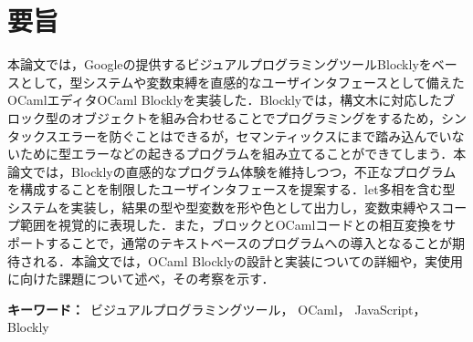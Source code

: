 \chapter*{要旨}

本論文では，Googleの提供するビジュアルプログラミングツールBlocklyをベースとして，型システムや変数束縛を直感的なユーザインタフェースとして備えたOCamlエディタOCaml Blocklyを実装した．Blocklyでは，構文木に対応したブロック型のオブジェクトを組み合わせることでプログラミングをするため，シンタックスエラーを防ぐことはできるが，セマンティックスにまで踏み込んでいないために型エラーなどの起きるプログラムを組み立てることができてしまう．本論文では，Blocklyの直感的なプログラム体験を維持しつつ，不正なプログラムを構成することを制限したユーザインタフェースを提案する．let多相を含む型システムを実装し，結果の型や型変数を形や色として出力し，変数束縛やスコープ範囲を視覚的に表現した．また，ブロックとOCamlコードとの相互変換をサポートすることで，通常のテキストベースのプログラムへの導入となることが期待される．本論文では，OCaml Blocklyの設計と実装についての詳細や，実使用に向けた課題について述べ，その考察を示す．

{\bf キーワード：}\ 
ビジュアルプログラミングツール，
OCaml，
JavaScript，
Blockly
